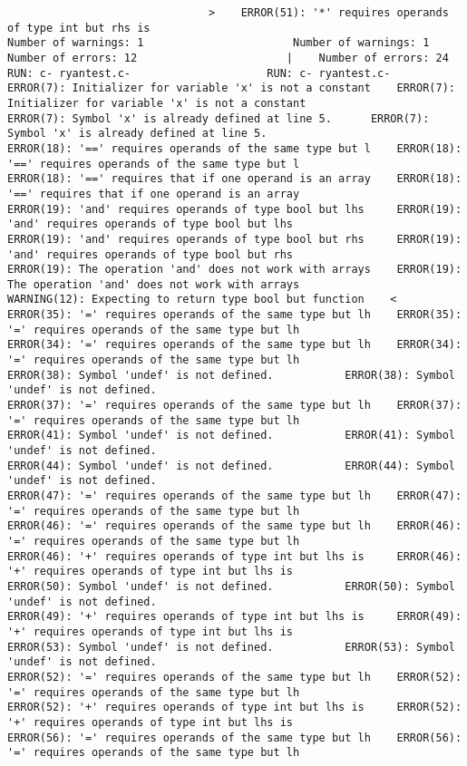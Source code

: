 \documentclass[12pt]{book}
\begin{document}
\begin{lstlisting}
							   >	ERROR(51): '*' requires operands of type int but rhs is 
Number of warnings: 1						Number of warnings: 1
Number of errors: 12					   |	Number of errors: 24
RUN: c- ryantest.c-						RUN: c- ryantest.c-
ERROR(7): Initializer for variable 'x' is not a constant	ERROR(7): Initializer for variable 'x' is not a constant
ERROR(7): Symbol 'x' is already defined at line 5.		ERROR(7): Symbol 'x' is already defined at line 5.
ERROR(18): '==' requires operands of the same type but l	ERROR(18): '==' requires operands of the same type but l
ERROR(18): '==' requires that if one operand is an array	ERROR(18): '==' requires that if one operand is an array
ERROR(19): 'and' requires operands of type bool but lhs 	ERROR(19): 'and' requires operands of type bool but lhs 
ERROR(19): 'and' requires operands of type bool but rhs 	ERROR(19): 'and' requires operands of type bool but rhs 
ERROR(19): The operation 'and' does not work with arrays	ERROR(19): The operation 'and' does not work with arrays
WARNING(12): Expecting to return type bool but function    <
ERROR(35): '=' requires operands of the same type but lh	ERROR(35): '=' requires operands of the same type but lh
ERROR(34): '=' requires operands of the same type but lh	ERROR(34): '=' requires operands of the same type but lh
ERROR(38): Symbol 'undef' is not defined.			ERROR(38): Symbol 'undef' is not defined.
ERROR(37): '=' requires operands of the same type but lh	ERROR(37): '=' requires operands of the same type but lh
ERROR(41): Symbol 'undef' is not defined.			ERROR(41): Symbol 'undef' is not defined.
ERROR(44): Symbol 'undef' is not defined.			ERROR(44): Symbol 'undef' is not defined.
ERROR(47): '=' requires operands of the same type but lh	ERROR(47): '=' requires operands of the same type but lh
ERROR(46): '=' requires operands of the same type but lh	ERROR(46): '=' requires operands of the same type but lh
ERROR(46): '+' requires operands of type int but lhs is 	ERROR(46): '+' requires operands of type int but lhs is 
ERROR(50): Symbol 'undef' is not defined.			ERROR(50): Symbol 'undef' is not defined.
ERROR(49): '+' requires operands of type int but lhs is 	ERROR(49): '+' requires operands of type int but lhs is 
ERROR(53): Symbol 'undef' is not defined.			ERROR(53): Symbol 'undef' is not defined.
ERROR(52): '=' requires operands of the same type but lh	ERROR(52): '=' requires operands of the same type but lh
ERROR(52): '+' requires operands of type int but lhs is 	ERROR(52): '+' requires operands of type int but lhs is 
ERROR(56): '=' requires operands of the same type but lh	ERROR(56): '=' requires operands of the same type but lh

\end{lstlisting}
\end{document}
